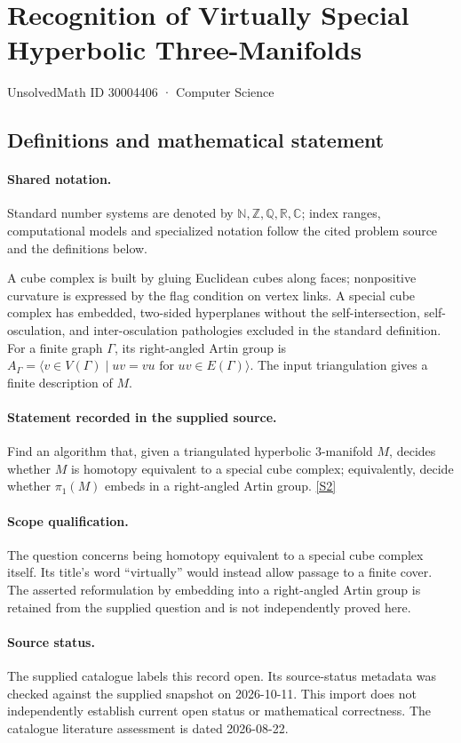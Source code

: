 \documentclass[11pt]{article}
\newcommand{\sref}[2]{\hyperlink{source:#1:#2}{[S#2]}}
\begin{document}
\setcounter{section}{30004405}
\section{Recognition of Virtually Special Hyperbolic Three-Manifolds}\label{30004406}
{\small\sffamily UnsolvedMath ID 30004406 · Computer Science}
\subsection{Definitions and mathematical statement}

\paragraph{Shared notation.}Standard number systems are denoted by $\mathbb N,\mathbb Z,\mathbb Q,\mathbb R,\mathbb C$; index ranges, computational models and specialized notation follow the cited problem source and the definitions below.


A cube complex is built by gluing Euclidean cubes along faces; nonpositive curvature is expressed by the flag condition on vertex links. A special cube complex has embedded, two-sided hyperplanes without the self-intersection, self-osculation, and inter-osculation pathologies excluded in the standard definition. For a finite graph $\Gamma$, its right-angled Artin group is $A_\Gamma=\langle v\in V(\Gamma)\mid uv=vu\text{ for }uv\in E(\Gamma)\rangle$. The input triangulation gives a finite description of $M$.
\paragraph{Statement recorded in the supplied source.}
Find an algorithm that, given a triangulated hyperbolic $3$-manifold $M$, decides whether $M$ is homotopy equivalent to a special cube complex; equivalently, decide whether $\pi_1(M)$ embeds in a right-angled Artin group. \sref{30004406}{2}
\paragraph{Scope qualification.}
The question concerns being homotopy equivalent to a special cube complex itself. Its title's word ``virtually'' would instead allow passage to a finite cover. The asserted reformulation by embedding into a right-angled Artin group is retained from the supplied question and is not independently proved here.
\paragraph{Source status.}
The supplied catalogue labels this record open. Its source-status metadata was checked against the supplied snapshot on 2026-10-11. This import does not independently establish current open status or mathematical correctness. The catalogue literature assessment is dated 2026-08-22.
\end{document}
